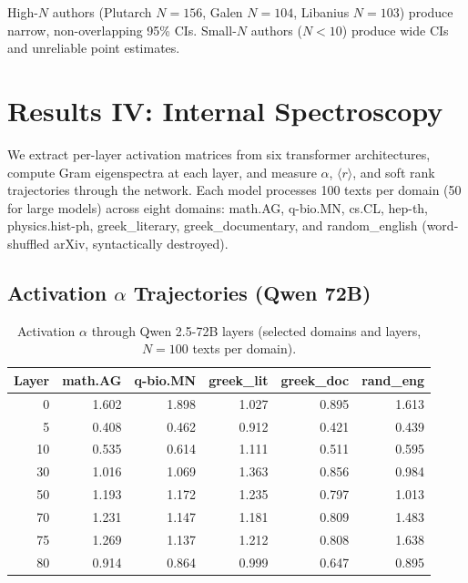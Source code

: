 \documentclass[12pt,letterpaper]{article}
\newcommand{\rbar}{\langle r \rangle}
\newcommand{\al}{\alpha}
\begin{document}
High-$N$ authors (Plutarch $N = 156$, Galen $N = 104$, Libanius
$N = 103$) produce narrow, non-overlapping 95\% CIs.  Small-$N$
authors ($N < 10$) produce wide CIs and unreliable point estimates.


\section{Results IV: Internal Spectroscopy}
\label{sec:spectroscopy}

We extract per-layer activation matrices from six transformer
architectures, compute Gram eigenspectra at each layer, and measure
$\al$, $\rbar$, and soft rank trajectories through the network.
Each model processes 100 texts per domain (50 for large models)
across eight domains: math.AG, q-bio.MN, cs.CL, hep-th,
physics.hist-ph, greek\_literary, greek\_documentary, and
random\_english (word-shuffled arXiv, syntactically destroyed).

\subsection{Activation $\al$ Trajectories (Qwen 72B)}
\label{sec:trajectories}

\begin{table}[H]
\centering
\caption{Activation $\al$ through Qwen 2.5-72B layers
(selected domains and layers, $N = 100$ texts per domain).}
\label{tab:act_alpha}
\begin{tabular}{rrrrrr}
\toprule
\textbf{Layer} & \textbf{math.AG} & \textbf{q-bio.MN} &
\textbf{greek\_lit} & \textbf{greek\_doc} & \textbf{rand\_eng} \\
\midrule
0 & 1.602 & 1.898 & 1.027 & 0.895 & 1.613 \\
5 & 0.408 & 0.462 & 0.912 & 0.421 & 0.439 \\
10 & 0.535 & 0.614 & 1.111 & 0.511 & 0.595 \\
30 & 1.016 & 1.069 & 1.363 & 0.856 & 0.984 \\
50 & 1.193 & 1.172 & 1.235 & 0.797 & 1.013 \\
70 & 1.231 & 1.147 & 1.181 & 0.809 & 1.483 \\
75 & 1.269 & 1.137 & 1.212 & 0.808 & 1.638 \\
80 & 0.914 & 0.864 & 0.999 & 0.647 & 0.895 \\
\bottomrule
\end{tabular}
\end{table}
\end{document}
